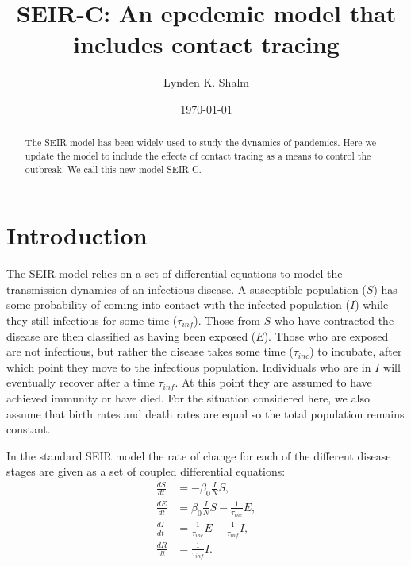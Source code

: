\documentclass[notitlepage, superscriptaddress]{revtex4-2}
\begin{document}
\title{SEIR-C: An epedemic model that includes contact tracing}

\author{Lynden K. Shalm}



\begin{abstract}
The SEIR model has been widely used to study the dynamics of pandemics. Here we update the model to include the effects of contact tracing as a means to control the outbreak. We call this new model SEIR-C.
\end{abstract}
\date{\today}
\maketitle

\section{Introduction}
The SEIR model relies on a set of differential equations to model the transmission dynamics of an infectious disease. A susceptible population ($S$) has some probability of coming into contact with the infected population ($I$) while they still infectious for some time ($\tau_{inf}$). Those from $S$ who have contracted the disease are then classified as having been exposed ($E$). Those who are exposed are not infectious, but rather the disease takes some time ($\tau_{inc}$) to incubate, after which point they move to the infectious population. Individuals who are in $I$ will eventually recover after a time $\tau_{inf}$. At this point they are assumed to have achieved immunity or have died. For the situation considered here, we also assume that birth rates and death rates are equal so the total population remains constant. 

In the standard SEIR model the rate of change for each of the different disease stages are given as a set of coupled differential equations:
\begin{eqnarray}
\label{E:SEIR}
\frac{dS}{dt} &= - \beta_0 \frac{I}{N}S, \\
\frac{dE}{dt} &= \beta_0 \frac{I}{N}S - \frac{1}{\tau_{inc}}E, \\ 
\frac{dI}{dt} &= \frac{1}{\tau_{inc}}E - \frac{1}{\tau_{inf}}I, \\ 
\frac{dR}{dt} &= \frac{1}{\tau_{inf}}I.
\end{eqnarray}
\end{document}
